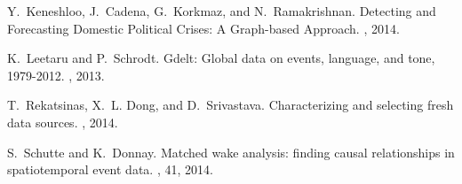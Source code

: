 \documentclass{sig-alternate}
\begin{document}
\begin{thebibliography}{10}

Y.~Keneshloo, J.~Cadena, G.~Korkmaz, and N.~Ramakrishnan.
\newblock Detecting and Forecasting Domestic Political Crises: A Graph-based Approach.
, 2014.

K.~Leetaru and P.~Schrodt.
\newblock Gdelt: Global data on events, language, and tone, 1979-2012.
, 2013.

T.~Rekatsinas, X.~L. Dong, and D.~Srivastava.
\newblock Characterizing and selecting fresh data sources.
, 2014.

S.~Schutte and K.~Donnay.
\newblock Matched wake analysis: finding causal relationships in spatiotemporal
  event data.
, 41, 2014.


\end{thebibliography}
\end{document}
